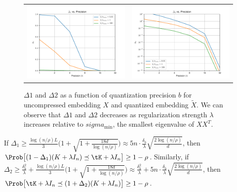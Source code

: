 \begin{figure}
	\centering	
	\begin{tabular}{c c}
		\includegraphics[width=0.45\linewidth]{figures/Delta1_vs_precision.pdf} &
		\includegraphics[width=0.45\linewidth]{figures/Delta2_vs_precision.pdf}
	\end{tabular}
	\label{fig:delta_vs_b}
	\caption{$\Delta1$ and $\Delta2$ as a function of quantization precision $b$ for uncompressed embedding $X$ and quantized embedding $\tilde{X}$. We can observe that $\Delta1$ and $\Delta2$ decreases as regularization strength $\lambda$ increases relative to $sigma_{\min}$, the smallest eigenvalue of $XX^T$.}
\end{figure}



\begin{corollary}
	\label{cor:main2}
	If $\Delta_1 \geq \frac{\log(n/\rho)L}{3}\Big(1+\sqrt{1+\frac{18d}{\log(n/\rho)}}\Big) \approx 5n\cdot \frac{\delta_b}{\lambda}\sqrt{\frac{2\log(n/\rho)}{d}}$,
	then $\Prob\big[(1 - \Delta_1) (K + \lambda I_n) \preceq \tK + \lambda I_n \big] \geq  1 - \rho$. 
	Similarly, if $\Delta_2 \geq \frac{\delta_b^2}{\lambda} +  \frac{\log(n/\rho)L}{3}\Big(1+\sqrt{1+\frac{18d}{\log(n/\rho)}}\Big) \approx \frac{\delta_b^2}{\lambda} + 5n\cdot \frac{\delta_b}{\lambda}\sqrt{\frac{2\log(n/\rho)}{d}}$,
	then $\Prob\big[\tK + \lambda I_n \preceq (1 + \Delta_2) (K + \lambda I_n)\big] \geq  1 - \rho$. 
\end{corollary}


